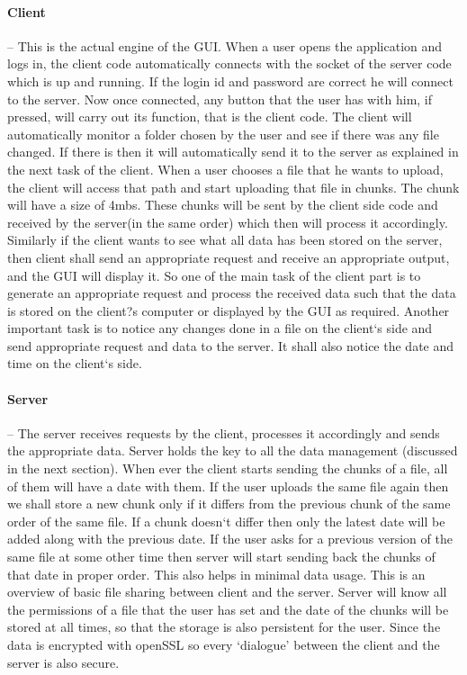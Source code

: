 \documentclass{article}
\begin{document}
\paragraph{Client}-- This is the actual engine of the GUI. When a user opens the application and logs in, the client code automatically connects with the socket of the server code which is up and running. If the login id and password are correct he will connect to the server. Now once connected, any button that the user has with him, if pressed, will carry out its function, that is the client code. 
The client will automatically monitor a folder chosen by the user and see if there was any file changed. If there is then it will automatically send it to the server as explained in the next task of the client. 
When a user chooses a file that he wants to upload, the client will access that path and start uploading that file in chunks. The chunk will have a size of 4mbs. These chunks will be sent by the client side code and received by the server(in the same order) which then will process it accordingly.
Similarly if the client wants to see what all data has been stored on the server, then client shall send an appropriate request and receive an appropriate output, and the GUI will display it. So one of the main task of the client part is to generate an appropriate request and process the received data such that the data is stored on the client?s computer or displayed by the GUI as required.
Another important task is to notice any changes done in a file on the client`s side and send appropriate request and data to the server. It shall also notice the date and time on the client`s side.

\paragraph{Server}-- The server receives requests by the client, processes it accordingly and sends the appropriate data. Server holds the key to all the data management (discussed in the next section).
When ever the client starts sending the chunks of a file, all of them will have a date with them. If the user uploads the same file again then we shall store a new chunk only if it differs from the previous chunk of the same order of the same file. If a chunk doesn`t differ then only the latest date will be added along with the previous date. If the user asks for a previous version of the same file at some other time then server will start sending back the chunks of that date in proper order. This also helps in minimal data usage. This is an overview of basic file sharing between client and the server.
Server will know all the permissions of a file that the user has set and the date of the chunks will be stored at all times, so that the storage is also persistent for the user.
Since the data is encrypted with openSSL so every `dialogue' between the client and the server is also secure.
\end{document}
